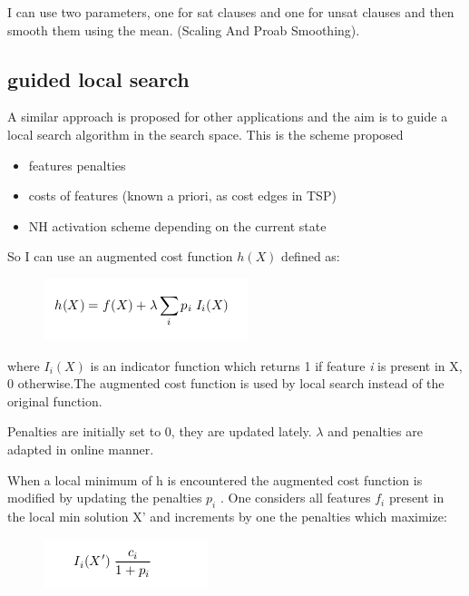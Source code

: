 \documentclass[11pt]{article}
\begin{document}
I can use two parameters, one for sat clauses and one for unsat clauses and then smooth them using the mean. (Scaling And Proab Smoothing).

\subsection{guided local search}
A similar approach is proposed for other applications and the aim is to guide a local search algorithm in the search space. 
This is the scheme proposed

\begin{itemize}
\item features penalties
\item costs of features (known a priori, as cost edges in TSP)
\item NH activation scheme depending on the current state 
\end{itemize}

So I can use an augmented cost function $ h(X) $ defined as:

\begin{figure}[H]
\includegraphics[scale=0.50]{augmented}
\centering
\end{figure}

where $ I_i(X) $ is an indicator function which returns 1 if feature  \textit{i} is present in X, 0 otherwise.The augmented cost
function is used by local search instead of the original function.
	
Penalties are initially set to 0, they are updated lately. $ \lambda $ and penalties are adapted in online manner. 

When a local minimum of h is encountered the augmented cost function is modified by updating the penalties $ p_i $ . One considers all features $ f_i $ present in the local min solution X' and increments by one the penalties which maximize:

\begin{figure}[H]
\includegraphics[scale=0.50]{penalties}
\centering
\end{figure}
\end{document}
